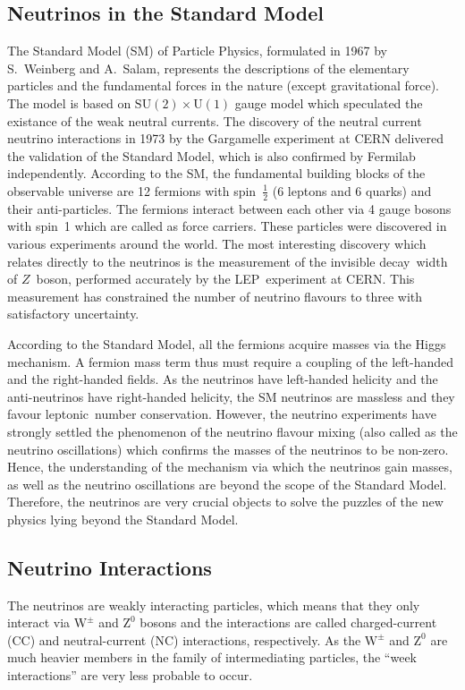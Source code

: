 \subsection{Neutrinos in the Standard Model}
The Standard Model (SM) of Particle Physics, formulated in 1967 by S.~Weinberg and A.~Salam, represents the descriptions of the elementary particles and the fundamental forces in the nature (except gravitational force)\cite{weinberg1967,abdus1968}.
The model is based on $\text{SU}\left(2\right)\times\text{U}\left(1\right)$ gauge model which speculated the existance of the weak neutral currents\cite{glashow1961}.
The discovery of the neutral current neutrino interactions in 1973 by the Gargamelle experiment at CERN delivered the validation of the Standard Model\cite{hasert1973,hasert1973_1,hasert1974}, which is also confirmed by Fermilab independently\cite{benvenuti1974}.
According to the SM, the fundamental building blocks of the observable universe are 12 fermions with spin~$\frac{1}{2}$ (6 leptons and 6 quarks) and their anti-particles.
The fermions interact between each other via 4 gauge bosons with spin~1 which are called as force carriers. These particles were discovered in various experiments around the world.
The most interesting discovery which relates directly to the neutrinos is the measurement of the invisible decay~width of $Z$~boson, performed accurately by the LEP~experiment at CERN\cite{numberneut}. This measurement has constrained the number of neutrino flavours to three with satisfactory uncertainty.

According to the Standard Model, all the fermions acquire masses via the Higgs mechanism.
A fermion mass term thus must require a coupling of the left-handed and the right-handed fields.
As the neutrinos have left-handed helicity and the anti-neutrinos have right-handed helicity, the SM neutrinos are massless and they favour leptonic~number conservation.
However, the neutrino experiments have strongly settled the phenomenon of the neutrino flavour mixing (also called as the neutrino oscillations) which confirms the masses of the neutrinos to be non-zero.
Hence, the understanding of the mechanism via which the neutrinos gain masses, as well as the neutrino oscillations are beyond the scope of the Standard Model.
Therefore, the neutrinos are very crucial objects to solve the puzzles of the new physics lying beyond the Standard Model.


\subsection{Neutrino Interactions}
The neutrinos are weakly interacting particles, which means that they only interact via $\mathrm{W}^{\pm}$ and $\mathrm{Z}^{0}$ bosons and the interactions are called charged-current (CC) and neutral-current (NC) interactions, respectively. As the $\mathrm{W}^{\pm}$ and $\mathrm{Z}^{0}$ are much heavier members in the family of intermediating particles, the ``week interactions'' are very less probable to occur.

